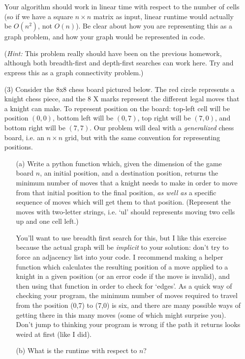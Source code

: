 \documentclass[12pt]{article}
\begin{document}
\begin{enumerate}
    Your algorithm should work in linear time with respect to the number of cells (so if we have a square $n \times n$ matrix as input, linear runtime would actually be $O(n^2)$, not $O(n)$). Be clear about how you are representing this as a graph problem, and how your graph would be represented in code. \par 
    
    (\emph{Hint:} This problem really should have been on the previous homework, although both breadth-first and depth-first searches can work here. Try and express this as a graph connectivity problem.)
    \item[(3)] Consider the 8x8 chess board pictured below. The red circle represents a knight chess piece, and the 8 X marks represent the different legal moves that a knight can make. To represent position on the board: top-left cell will be position $(0,0)$, bottom left will be $(0,7)$, top right will be $(7,0)$, and bottom right will be $(7,7)$. Our problem will deal with a \emph{generalized} chess board, i.e. an $n \times n$ grid, but with the same convention for representing positions. \par 
    \begin{itemize}
        \item[(a)] Write a python function which, given the dimension of the game board $n$, an initial position, and a destination position, returns the minimum number of moves that a knight needs to make in order to move from that initial position to the final position, \emph{as well as} a specific sequence of moves which will get them to that position. (Represent the moves with two-letter strings, i.e. `ul' should represents moving two cells up and one cell left.) \par 
    
        You'll want to use breadth first search for this, but I like this exercise because the actual graph will be \emph{implicit} to your solution: don't try to force an adjacency list into your code. I recommend making a helper function which calculates the resulting position of a move applied to a knight in a given position (or an error code if the move is invalid), and then using that function in order to check for `edges'. As a quick way of checking your program, the minimum number of moves required to travel from the position (0,7) to (7,0) is six, and there are many possible ways of getting there in this many moves (some of which might surprise you). Don't jump to thinking your program is wrong if the path it returns looks weird at first (like I did).
        \item[(b)] What is the runtime with respect to $n$?
    \end{itemize}
    \begin{center}
\end{center}
\end{enumerate}
\end{document}
